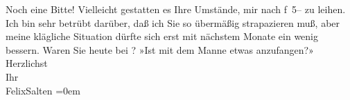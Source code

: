 \begin{ledgroupsized}[t]{13cm}
           Noch eine Bitte! Vielleicht gestatten es Ihre Umstände, mir nach f 5– zu leihen. Ich
               bin sehr {\pb}betrübt darüber,
               daß ich Sie so übermäßig strapazieren muß, aber meine klägliche Situation dürfte sich
               erst mit nächstem Monate ein wenig bessern.\pend
           \pstart
           Waren Sie heute bei \label{K_L03109-3v}\label{K_L03109-3h}? »Ist mit dem Manne
               etwas anzufangen?»\pend
           \pstart
           Herzlichst{\\[\baselineskip]}Ihr{\\[\baselineskip]}\spacefill\mbox{FelixSalten}\pend
           \leftskip=0em{}
         
         \endnumbering{}\end{ledgroupsized}\begin{anhang}\end{anhang}\newcommand{\dateiname}{L03109}\newcommand{\titel}{Felix Salten an Arthur Schnitzler, [25. 5. 1892]}\newcommand{\editorInnen}{Martin Anton Müller und Laura Untner}
      
